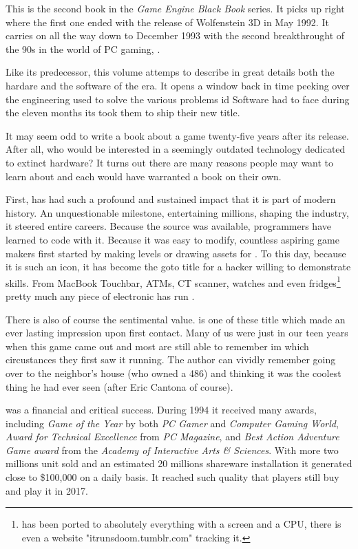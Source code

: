 This is the second book in the \textit{Game Engine Black Book} series. It picks up right where the first one ended with the release of Wolfenstein 3D in May 1992. It carries on all the way down to December 1993 with the second breakthrought of the 90s in the world of PC gaming, \doom.\\
\par
 Like its predecessor, this volume attemps to describe in great details both the hardare and the software of the era. It opens a window back in time peeking over the engineering used to solve the various problems id Software had to face during the eleven months its took them to ship their new title.\\%
\par
It may seem odd to write a book about a game twenty-five years after its release. After all, who would be interested in a seemingly outdated technology dedicated to extinct hardware? It turns out there are many reasons people may want to learn about \doom and each would have warranted a book on their own.\\ 
\par
First, \doom has had such a profound and sustained impact that it is part of modern history. An unquestionable milestone, entertaining millions, shaping the industry, it steered entire careers. Because the source was available, programmers have learned to code with it. Because it was easy to modify, countless aspiring game makers first started by making levels or drawing assets for \doom. To this day, because it is such an icon, it has become the goto title for a hacker willing to demonstrate skills. From MacBook Touchbar, ATMs, CT scanner, watches and even fridges\footnote{\doom has been ported to absolutely everything with a screen and a CPU, there is even a website "itrunsdoom.tumblr.com" tracking it.} pretty much any piece of electronic has run \doom.\\
\par


There is also of course the sentimental value. \doom is one of these title which made an ever lasting impression upon first contact. Many of us were just in our teen years when this game came out and most are still able to remember im which circustances they first saw it running. The author can vividly remember going over to the neighbor's house (who owned a 486) and thinking it was the coolest thing he had ever seen (after Eric Cantona of course).\\
\par
\doom was a financial and critical success. During 1994 it received many awards, including \textit{Game of the Year} by both \textit{PC Gamer} and \textit{Computer Gaming World}, \textit{Award for Technical Excellence} from \textit{PC Magazine}, and \textit{Best Action Adventure Game award} from the \textit{Academy of Interactive Arts \& Sciences}. With more two millions unit sold and an estimated 20 millions shareware installation it generated close to \$100,000 on a daily basis. It reached such quality that players still buy and play it in 2017.\\
\par

